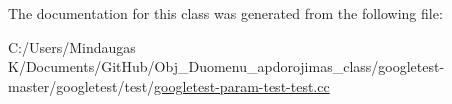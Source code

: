 The documentation for this class was generated from the following file\+:\begin{DoxyCompactItemize}
\item 
C\+:/\+Users/\+Mindaugas K/\+Documents/\+Git\+Hub/\+Obj\+\_\+\+Duomenu\+\_\+apdorojimas\+\_\+class/googletest-\/master/googletest/test/\mbox{\hyperlink{googletest-master_2googletest_2test_2googletest-param-test-test_8cc}{googletest-\/param-\/test-\/test.\+cc}}\end{DoxyCompactItemize}

